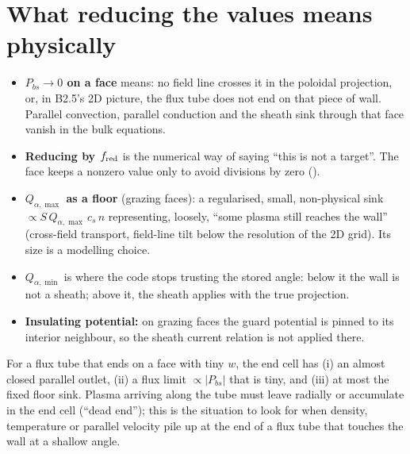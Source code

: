 \documentclass[11pt,a4paper]{article}
\newcommand{\code}[1]{{\small\path{#1}}}
\newcommand{\wrk}{w}
\newcommand{\qmin}{Q_{\alpha,\min}}
\newcommand{\qmax}{Q_{\alpha,\max}}
\begin{document}
\section{What reducing the values means physically}\label{sec:phys}
\begin{itemize}
\item \textbf{$P_{bs}\to0$ on a face} means: no field line crosses it in the poloidal projection, or, in B2.5's 2D
      picture, the flux tube does not end on that piece of wall. Parallel convection, parallel conduction and the sheath
      sink through that face vanish in the bulk equations.
\item \textbf{Reducing by $f_{\rm red}$} is the numerical way of saying ``this is not a target''. The face keeps a nonzero value
      only to avoid divisions by zero (\code{fcPbs+cutlo}).
\item \textbf{$\qmax$ as a floor} (grazing faces): a regularised, small, non-physical sink $\propto S\,\qmax\,c_s\,n$ representing,
      loosely, ``some plasma still reaches the wall'' (cross-field transport, field-line tilt below the resolution of the 2D grid).
      Its size is a modelling choice.
\item \textbf{$\qmin$} is where the code stops trusting the stored angle: below it the wall is not a sheath; above it,
      the sheath applies with the true projection.
\item \textbf{Insulating potential:} on grazing faces the guard potential is pinned to its interior neighbour, so
      the sheath current relation is not applied there.
\end{itemize}

For a flux tube that ends on a face with tiny $\wrk$, the end cell has (i) an almost closed parallel outlet, (ii) a flux
limit $\propto|P_{bs}|$ that is tiny, and (iii) at most the fixed floor sink. Plasma arriving along the tube must leave
radially or accumulate in the end cell (``dead end''); this is the situation to look for when density, temperature or
parallel velocity pile up at the end of a flux tube that touches the wall at a shallow angle.

\end{document}
